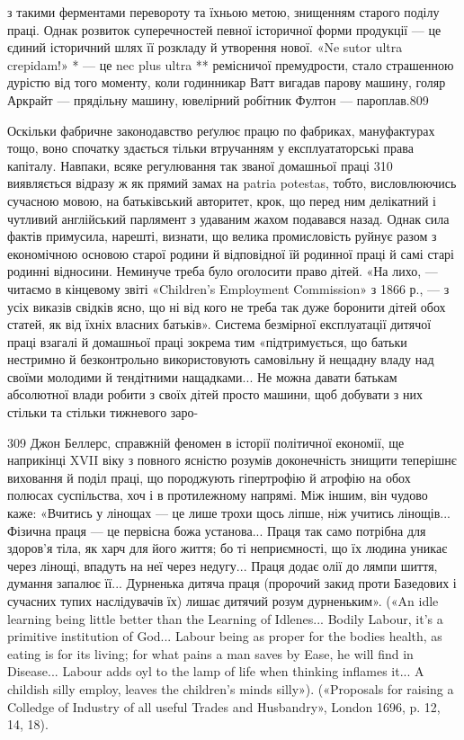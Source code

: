 з такими ферментами перевороту та їхньою метою, знищенням
старого поділу праці. Однак розвиток суперечностей певної історичної
форми продукції — це єдиний історичний шлях її розкладу
й утворення нової. «Ne sutor ultra crepidam!» * — це nec plus
ultra ** ремісничої премудрости, стало страшенною дурістю від
того моменту, коли годинникар Ватт вигадав парову машину,
голяр Аркрайт — прядільну машину, ювелірний робітник Фултон
— пароплав.809

Оскільки фабричне законодавство реґулює працю по фабриках,
мануфактурах тощо, воно спочатку здається тільки втручанням
у експлуататорські права капіталу. Навпаки, всяке регулювання
так званої домашньої праці 310 виявляється відразу ж
як прямий замах на patria potestas, тобто, висловлюючись сучасною
мовою, на батьківський авторитет, крок, що перед ним делікатний
і чутливий англійський парлямент з удаваним жахом
подавався назад. Однак сила фактів примусила, нарешті, визнати,
що велика промисловість руйнує разом з економічною основою
старої родини й відповідної їй родинної праці й самі старі родинні
відносини. Неминуче треба було оголосити право дітей. «На лихо,
— читаємо в кінцевому звіті «Children’s Employment Commission»
з 1866 р., — з усіх виказів свідків ясно, що ні від кого
не треба так дуже боронити дітей обох статей, як від їхніх власних
батьків». Система безмірної експлуатації дитячої праці взагалі
й домашньої праці зокрема тим «підтримується, що батьки нестримно
й безконтрольно використовують самовільну й нещадну
владу над своїми молодими й тендітними нащадками... Не можна
давати батькам абсолютної влади робити з своїх дітей просто
машини, щоб добувати з них стільки та стільки тижневого заро-

309    Джон Беллерс, справжній феномен в історії політичної економії,
ще наприкінці XVII віку з повного ясністю розумів доконечність знищити
теперішнє виховання й поділ праці, що породжують гіпертрофію й атрофію
на обох полюсах суспільства, хоч і в протилежному напрямі. Між
іншим, він чудово каже: «Вчитись у лінощах — це лише трохи щось ліпше,
ніж учитись лінощів... Фізична праця — це первісна божа установа...
Праця так само потрібна для здоров’я тіла, як харч для його життя;
бо ті неприємності, що їх людина уникає через лінощі, впадуть на неї
через недугу... Праця додає олії до лямпи шиття, думання запалює її...
Дурненька дитяча праця (пророчий закид проти Базедових і сучасних
тупих наслідувачів їх) лишає дитячий розум дурненьким». («An idle
learning being little better than the Learning of Idlenes... Bodily Labour,
it’s a primitive institution of God... Labour being as proper for the
bodies health, as eating is for its living; for what pains a man saves by
Ease, he will find in Disease... Labour adds oyl to the lamp of life when
thinking inflames it... A childish silly employ, leaves the children’s minds
silly»). («Proposals for raising a Colledge of Industry of all useful Trades
and Husbandry», London 1696, p. 12, 14, 18).

